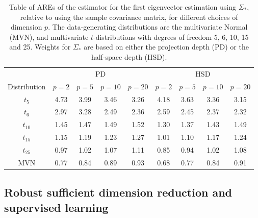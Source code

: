 \begin{table}[t]
\centering
\begin{footnotesize}
\begin{tabular}{c|cccc|cccc}
    \hline
    & \multicolumn{4}{c|}{PD} & \multicolumn{4}{c}{HSD} \\\cline{2-9}
    Distribution & $p=2$  & $p=5$  & $p=10$ & $p=20$ & $p=2$  & $p=5$  & $p=10$ & $p=20$ \\ \hline
    $t_5$           & 4.73 & 3.99 & 3.46 & 3.26 & 4.18 & 3.63 & 3.36 & 3.15 \\
    $t_6$           & 2.97 & 3.28 & 2.49 & 2.36 & 2.59 & 2.45 & 2.37 & 2.32 \\
    $t_{10}$          & 1.45 & 1.47 & 1.49 & 1.52 & 1.30 & 1.37 & 1.43 & 1.49 \\
    $t_{15}$          & 1.15 & 1.19 & 1.23 & 1.27 & 1.01 & 1.10 & 1.17 & 1.24 \\
    $t_{25}$          & 0.97 & 1.02 & 1.07 & 1.11 & 0.85 & 0.94 & 1.02 & 1.08 \\
    MVN          & 0.77 & 0.84 & 0.89 & 0.93 & 0.68 & 0.77 & 0.84 & 0.91 \\ 
    \hline
\end{tabular}
\end{footnotesize}
\caption{Table of AREs of the estimator for the first eigenvector estimation using 
$\Sigma_{*}$, relative to using the sample covariance matrix, for different choices of 
dimension $p$. The data-generating distributions are the multivariate Normal (MVN), 
and multivariate $t$-distributions with degrees of freedom 5, 6, 10, 15 and 25. Weights 
for $\Sigma_{*}$ are based on either the projection depth (PD) or the half-space 
depth (HSD).}
\label{table:AREtable}
\end{table}




\subsection{Robust sufficient dimension reduction and supervised learning}

